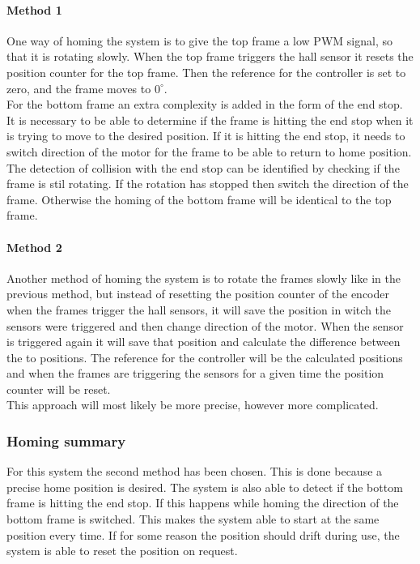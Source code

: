 \documentclass[../../../main]{subfiles}
\begin{document}
\paragraph{Method 1}%
\label{par:method_1}
One way of homing the system is to give the top frame a low PWM signal, so  that it is rotating slowly.
When the top frame triggers the hall sensor it resets the position counter for the top frame.
Then the reference for the controller is set to zero, and the frame moves to $0^\circ$.
\\
For the bottom frame an extra complexity is added in the form of the end stop. It is necessary to be able to determine if the frame is hitting the end stop when it is trying to move to the desired position.
If it is hitting the end stop, it needs to switch direction of the motor for the frame to be able to return to home position.
The detection of collision with the end stop can be identified by checking if the frame is stil rotating. If the rotation has stopped then switch the direction of the frame.
Otherwise the homing of the bottom frame will be identical to the top frame.

\paragraph{Method 2}%
\label{par:method_2}
Another method of homing the system is to rotate the frames slowly like in the previous method, but instead of resetting the position counter of the encoder when the frames trigger the hall sensors, it will save the position in witch the sensors were triggered and then change direction of the motor.
When the sensor is triggered again it will save that position and calculate the difference between the to positions.
The reference for the controller will be the calculated positions and when the frames are triggering the sensors for a given time the position counter will be reset.
\\
This approach will most likely be more precise, however more complicated.

\subsubsection{Homing summary}%
\label{ssub:homing_summary}
For this system the second method has been chosen. This is done because a precise home position is desired.
The system is also able to detect if the bottom frame is hitting the end stop. If this happens while homing the direction of the bottom frame is switched. 
This makes the system able to start at the same position every time.
If for some reason the position should drift during use, the system is able to reset the position on request.
\end{document}
